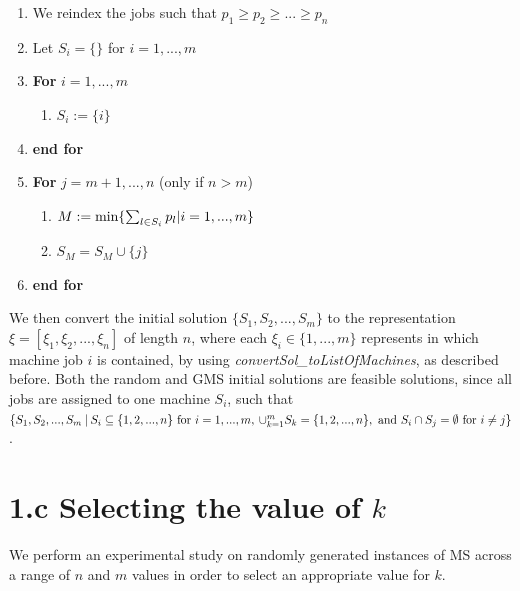 \documentclass[12pt,a4paper,reqno]{article}
\begin{document}
\begin{enumerate}
\item We reindex the jobs such that $p_1 \geq p_2 \geq ... \geq p_n$
\item Let $S_i = \{ \}$ for $i=1,...,m$
\item \textbf{For} $i=1,...,m$
\begin{enumerate}
\item $S_i := \{i \}$
\end{enumerate}
\item[] \textbf{end for}
\item \textbf{For} $j=m+1,...,n$ (only if $n > m$)
\begin{enumerate}
\item $M := \textnormal{min} \{ \sum_{l \in S_i} p_l | i = 1,...,m \}$
\item $S_M = S_M \cup \{ j \}$
\end{enumerate}
\item[] \textbf{end for}
\end{enumerate}

We then convert the initial solution $\{S_1,S_2,...,S_m\}$ to the representation $\xi = [\xi_1,\xi_2,...,\xi_n]$ of length $n$, where each $\xi_i \in \{1,...,m\}$ represents in which machine job $i$ is contained, by using \textit{convertSol\_toListOfMachines}, as described before. Both the random and GMS initial solutions are feasible solutions, since all jobs are assigned to one machine $S_i$, such that $\{S_1,S_2,...,S_m \> | \> S_i \subseteq \{1,2,...,n\} \textnormal{ for } i=1,...,m, \> \cup_{k=1}^m S_k = \{1,2,...,n\}, \textnormal{ and } S_i \cap S_j = \emptyset \textnormal{ for } i \neq j \}$. \\

\section*{1.c Selecting the value of $k$}
We perform an experimental study on randomly generated instances of MS across a range of $n$ and $m$ values in order to select an appropriate value for $k$. \\
\end{document}
